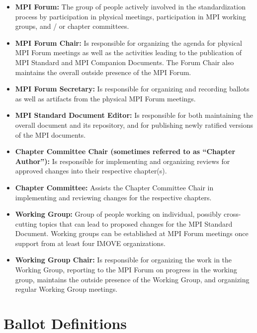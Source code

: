 \begin{itemize}
\item {\bf MPI Forum:} The group of people actively involved in the
  standardization process by participation in physical meetings,
  participation in MPI working groups, and / or chapter committees.
\item {\bf MPI Forum Chair:} Is responsible for organizing the agenda
  for physical MPI Forum meetings as well as the activities leading to the
  publication of MPI Standard and MPI Companion Documents. The Forum
  Chair also maintains the overall outside presence of the MPI Forum.
\item {\bf MPI Forum Secretary:} Is responsible for organizing and
  recording ballots as well as artifacts from the physical MPI Forum
  meetings.
\item {\bf MPI Standard Document Editor:} Is responsible for both
  maintaining the overall document and its repository, and for
  publishing newly ratified versions of the MPI documents.
\item {\bf Chapter Committee Chair (sometimes referred to as ``Chapter
  Author''):} Is responsible for implementing and organizing reviews
  for approved changes into their respective chapter(s).
\item {\bf Chapter Committee:} Assists the Chapter Committee Chair in
  implementing and reviewing changes for the respective chapters.
\item {\bf Working Group:} Group of people working on individual,
  possibly cross-cutting topics that can lead to proposed changes for
  the MPI Standard Document. Working groups can be established at MPI
  Forum meetings once support from at least four IMOVE organizations.
\item {\bf Working Group Chair:} Is responsible for organizing the
  work in the Working Group, reporting to the MPI Forum on progress in
  the working group, maintains the outside presence of the Working
  Group, and organizing regular Working Group meetings.
\end{itemize}

\section{Ballot Definitions}

